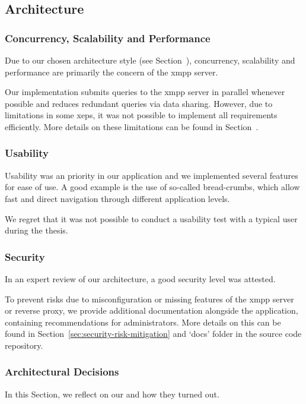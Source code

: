 \subsection{Architecture}

\subsubsection{Concurrency, Scalability and Performance}
Due to our chosen architecture style (see Section~),
concurrency, scalability and performance are primarily the concern of the \gls{xmpp} server.

Our implementation submits queries to the \gls{xmpp} server in parallel whenever possible and reduces redundant queries via data sharing. However, due to limitations in some \glspl{xep}, it was not possible to implement all requirements efficiently.
More details on these limitations can be found in Section~.

\subsubsection{Usability}
Usability was an priority in our application and we implemented several features for ease of use.
A good example is the use of so-called bread-crumbs, which allow fast and direct navigation through different application levels.

We regret that it was not possible to conduct a usability test with a typical user during the thesis.

\subsubsection{Security}
In an expert review of our architecture, a good security level was attested.

To prevent risks due to misconfiguration or missing features of the \gls{xmpp} server or reverse proxy, we provide additional documentation alongside the application, containing recommendations for administrators. More details on this can be found in Section~\ref{sec:security-risk-mitigation} and `docs' folder in the source code repository.

\subsubsection{Architectural Decisions}
In this Section, we reflect on our  and how they turned out.

